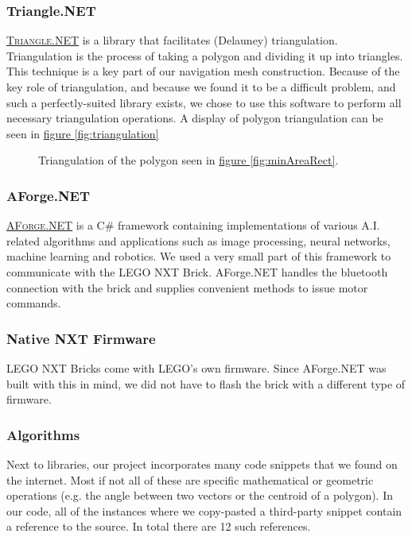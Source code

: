 \documentclass[10pt, abstracton, twocolumn]{scrartcl}
\newcommand{\fref}[1]{\hyperref[#1]{figure \vref{#1}}}
\newcommand{\link}[2]{\textsc{\href{#1}{#2}}}
\begin{document}
\subsubsection{Triangle.NET}
\link{http://triangle.codeplex.com/}{Triangle.NET} is a library that facilitates (Delauney) triangulation. Triangulation is the process of taking a polygon and dividing it up into triangles. This technique is a key part of our navigation mesh construction. Because of the key role of triangulation, and because we found it to be a difficult problem, and such a perfectly-suited library exists, we chose to use this software to perform all necessary triangulation operations. A display of polygon triangulation can be seen in \fref{fig:triangulation}

\begin{figure}
        \centering
        
        \caption{\small Triangulation of the polygon seen in \fref{fig:minAreaRect}.}
        \label{fig:triangulation}
\end{figure}

\subsubsection{AForge.NET}
\link{http://www.aforgenet.com}{AForge.NET} is a C\# framework containing implementations of various A.I. related algorithms and applications such as image processing, neural networks, machine learning and robotics. We used a very small part of this framework to communicate with the LEGO NXT Brick. AForge.NET handles the bluetooth connection with the brick and supplies convenient methods to issue motor commands.

\subsubsection{Native NXT Firmware}
LEGO NXT Bricks come with LEGO's own firmware. Since AForge.NET was built with this in mind, we did not have to flash the brick with a different type of firmware.

\subsubsection{Algorithms}
Next to libraries, our project incorporates many code snippets that we found on the internet. Most if not all of these are specific mathematical or geometric operations (e.g. the angle between two vectors or the centroid of a polygon). In our code, all of the instances where we copy-pasted a third-party snippet contain a reference to the source. In total there are 12 such references.
\end{document}
